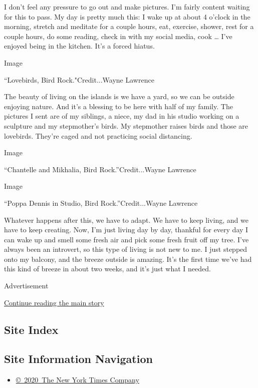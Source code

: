 I don't feel any pressure to go out and make pictures. I'm fairly
content waiting for this to pass. My day is pretty much this: I wake up
at about 4 o'clock in the morning, stretch and meditate for a couple
hours, eat, exercise, shower, rest for a couple hours, do some reading,
check in with my social media, cook \ldots{} I've enjoyed being in the
kitchen. It's a forced hiatus.

Image

``Lovebirds, Bird Rock."Credit...Wayne Lawrence

The beauty of living on the islands is we have a yard, so we can be
outside enjoying nature. And it's a blessing to be here with half of my
family. The pictures I sent are of my siblings, a niece, my dad in his
studio working on a sculpture and my stepmother's birds. My stepmother
raises birds and those are lovebirds. They're caged and not practicing
social distancing.

Image

``Chantelle and Mikhalia, Bird Rock.''Credit...Wayne Lawrence

Image

``Poppa Dennis in Studio, Bird Rock.''Credit...Wayne Lawrence

Whatever happens after this, we have to adapt. We have to keep living,
and we have to keep creating. Now, I'm just living day by day, thankful
for every day I can wake up and smell some fresh air and pick some fresh
fruit off my tree. I've always been an introvert, so this type of living
is not new to me. I just stepped onto my balcony, and the breeze outside
is amazing. It's the first time we've had this kind of breeze in about
two weeks, and it's just what I needed.

Advertisement

\protect\hyperlink{after-bottom}{Continue reading the main story}

\hypertarget{site-index}{%
\subsection{Site Index}\label{site-index}}

\hypertarget{site-information-navigation}{%
\subsection{Site Information
Navigation}\label{site-information-navigation}}

\begin{itemize}
\tightlist
\item
  \href{https://help.nytimes3xbfgragh.onion/hc/en-us/articles/115014792127-Copyright-notice}{©~2020~The
  New York Times Company}
\end{itemize}

